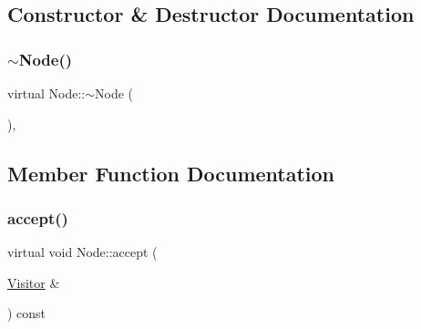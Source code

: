 \subsection{Constructor \& Destructor Documentation}
\mbox{\label{struct_node_af5e3fa79300bf5f3f2f3ecae6e795a94}} 
\subsubsection{\texorpdfstring{$\sim$\+Node()}{~Node()}}
{\footnotesize\ttfamily virtual Node\+::$\sim$\+Node (\begin{DoxyParamCaption}{ }\end{DoxyParamCaption})\hspace{0.3cm}{\ttfamily [inline]}, {\ttfamily [virtual]}}



\subsection{Member Function Documentation}
\mbox{\label{struct_node_a10bd7af968140bbf5fa461298a969c71}} 
\subsubsection{\texorpdfstring{accept()}{accept()}}
{\footnotesize\ttfamily virtual void Node\+::accept (\begin{DoxyParamCaption}\item[{\hyperlink{struct_visitor}{Visitor} \&}]{ }\end{DoxyParamCaption}) const\hspace{0.3cm}{\ttfamily [pure virtual]}}



